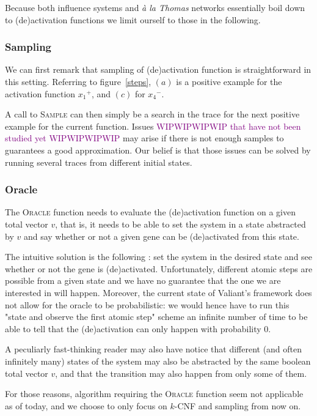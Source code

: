 \documentclass{llncs}
\newcommand{\wip}[1]{\textcolor{Purple}{WIPWIPWIPWIP #1 WIPWIPWIPWIP}}
\begin{document}
Because both influence systems and \textit{\`{a} la Thomas} networks essentially boil down to (de)activation functions we limit ourself to those in the following.

\subsubsection{Sampling}

We can first remark that sampling of (de)activation function is straightforward in this setting. Referring to figure~\ref{steps}, $(a)$ is a positive example for the activation function ${x_1}^+$, and $(c)$ for ${x_4}^-$.

A call to \textsc{Sample} can then simply be a search in the trace for the next positive example for the current function. Issues \wip{that have not been studied yet} may arise if there is not enough samples to guarantees a good approximation. Our belief is that those issues can be solved by running several traces from different initial states.

\subsubsection{Oracle}
The \textsc{Oracle} function needs to evaluate the (de)activation function on a given total vector $v$, that is, it needs to be able to set the system in a state abstracted by $v$ and say whether or not a given gene can be (de)activated from this state.

The intuitive solution is the following : set the system in the desired state and see whether or not the gene is (de)activated. Unfortunately, different atomic steps are possible from a given state and we have no guarantee that the one we are interested in will happen. Moreover, the current state of Valiant's framework does not allow for the oracle to be probabilistic: we would hence have to run this "state and observe the first atomic step" scheme an infinite number of time to be able to tell that the (de)activation can only happen with probability 0.

A peculiarly fast-thinking reader may also have notice that different (and often infinitely many) states of the system may also be abstracted by the same boolean total vector $v$, and that the transition may also happen from only some of them.

For those reasons, algorithm requiring the \textsc{Oracle} function seem not applicable as of today, and we choose to only focus on $k$-CNF and sampling from now on.
\end{document}
